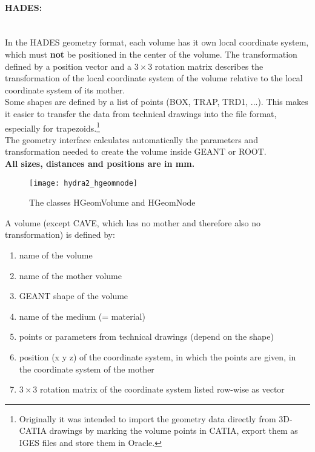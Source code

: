\paragraph{HADES:} ~\\
In the HADES geometry format, each volume has it own local coordinate system, which must \textbf{not} be positioned in the 
center of the volume. The transformation defined by a position vector and a $3\times3$ rotation matrix describes the transformation 
of the local coordinate system of the volume relative to the local coordinate system of its mother.\\
Some shapes are defined by a list of points (BOX, TRAP, TRD1, ...). This makes it easier to transfer the data from technical 
drawings into the file format, especially for trapezoids.\footnote{Originally it was intended to import the geometry data 
directly from 3D-CATIA drawings by marking the volume points in CATIA, export them as IGES files and store them in Oracle.}\\
The geometry interface calculates automatically the parameters and transformation needed to create the volume inside GEANT 
or ROOT.\\
\textbf{All sizes, distances and positions are in mm.}


\begin{figure}[\htb]
  \centering
  \texttt{[image: hydra2\_hgeomnode]}
  \caption[The classes HGeomVolume and HGeomNode]{The classes HGeomVolume and HGeomNode} \label{fig:geomhgeomnode}
\end{figure}

A volume (except CAVE, which has no mother and therefore also no transformation) is defined by:
\begin{enumerate}
  \item name of the volume
  \item name of the mother volume
  \item GEANT shape of the volume
  \item name of the medium (= material)
  \item points or parameters from technical drawings (depend on the shape)
  \item position (x y z) of the coordinate system, in which the points are given, in the coordinate system of the mother
  \item $3\times3$ rotation matrix of the coordinate system listed row-wise as vector
\end{enumerate}

